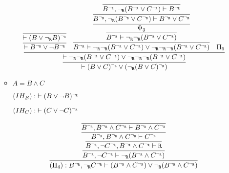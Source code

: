 \begin{enumerate}[(i)]
\begin{itemize}
            $$
            \infer{
                \vdash (B \vee C)^\ngr \vee (\ngr (B \vee C)^\ngr)
            }{
                \infer{
                    \vdash \ngr\ngr(B^\ngr \vee C^\ngr) \vee \ngr\ngr\ngr (B^\ngr \vee C^\ngr)
                }{
                    \infer{
                        \vdash B^\ngr \vee \neg B^\ngr
                    }{
                        \infer{
                            \vdash (B \vee \ngr B)^\ngr
                        }{
                        }
                    }&
                    \infer{
                        B^\ngr \vdash \ngr\ngr(B^\ngr \vee C^\ngr) \vee \ngr\ngr\ngr (B^\ngr \vee C^\ngr)
                    }{
                        \infer{
                            B^\ngr \vdash \ngr\ngr(B^\ngr \vee C^\ngr)
                        }{
                            \infer{
                                \Psi_3
                            }{
                                \infer{
                                    B^\ngr, \ngr(B^\ngr \vee C^\ngr) \vdash B^\ngr \vee C^\ngr
                                }{
                                    \infer{
                                        B^\ngr, \ngr(B^\ngr \vee C^\ngr) \vdash B^\ngr
                                    }{
                                    }
                                }
                            }
                        }
                    }&
                    \Pi_9
                }
            }
            $$

        \item $A = B \wedge C$
        
            $(IH_B) : \; \vdash (B \vee \neg B)^{\neg_{\texttt{R}}}$
            
            $(IH_C) : \; \vdash (C \vee \neg C)^{\neg_{\texttt{R}}}$


            $$
                \infer{
                    (\Pi_4) : B^\ngr, \ngr C^\ngr \vdash (B^\ngr \wedge C^\ngr) \vee \ngr(B^\ngr \wedge C^\ngr)
                }{
                    \infer{
                        B^\ngr, \neg C^\ngr \vdash \ngr(B^\ngr \wedge C^\ngr)
                    }{
                        \infer{
                            B^\ngr, \neg C^\ngr, B^\ngr \wedge C^\ngr \vdash \R
                        }{
                            \infer{
                                B^\ngr, B^\ngr \wedge C^\ngr \vdash C^\ngr
                            }{
                                \infer{
                                    B^\ngr, B^\ngr \wedge C^\ngr \vdash B^\ngr \wedge C^\ngr
                                }{
                                }
                            }
                        }
                    }
                }
            $$



\end{itemize}
\end{enumerate}
